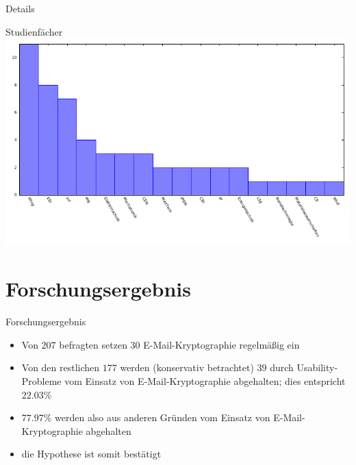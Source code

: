 \documentclass[]{beamer}
\begin{document}
\begin{frame}{Details}
	\begin{center}
		Studienfächer
		\includegraphics[scale=0.9]{plots/noplan.pdf}
	\end{center}
\end{frame}

\section{Forschungsergebnis}
\begin{frame}{Forschungsergebnis}
\begin{itemize}
	\item Von $207$ befragten setzen $30$ E-Mail-Kryptographie regelmäßig ein
	\item Von den restlichen $177$ werden (konservativ betrachtet) $39$ durch Usability-Probleme
		vom Einsatz von E-Mail-Kryptographie abgehalten; dies entspricht $22.03\%$
	\item $77.97\%$ werden also aus anderen Gründen vom Einsatz von E-Mail-Kryptographie abgehalten
	\item<2> die Hypothese ist somit bestätigt
\end{itemize}
\end{frame}
\end{document}
